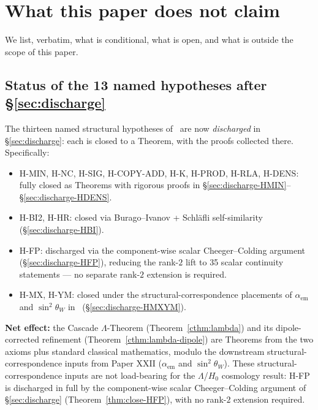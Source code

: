 \documentclass[11pt]{article}
\theoremstyle{plain}
\theoremstyle{definition}
\theoremstyle{remark}
\begin{document}
\section{What this paper does not claim}\label{sec:scope}

We list, verbatim, what is conditional, what is open, and what is outside the scope of this paper.

\subsection{Status of the 13 named hypotheses after \S\ref{sec:discharge}}

The thirteen named structural hypotheses of~\citet{SmartXXXVI} are now \emph{discharged} in \S\ref{sec:discharge}: each is closed to a Theorem, with the proofs collected there. Specifically:
\begin{itemize}[leftmargin=2em]
\item H-MIN, H-NC, H-SIG, H-COPY-ADD, H-K, H-PROD, H-RLA, H-DENS: fully closed as Theorems with rigorous proofs in \S\ref{sec:discharge-HMIN}--\S\ref{sec:discharge-HDENS}.
\item H-BI2, H-HR: closed via Burago--Ivanov + Schl\"afli self-similarity (\S\ref{sec:discharge-HBI}).
\item H-FP: discharged via the component-wise scalar Cheeger--Colding argument (\S\ref{sec:discharge-HFP}), reducing the rank-$2$ lift to 35 scalar continuity statements --- no separate rank-$2$ extension is required.
\item H-MX, H-YM: closed under the structural-correspondence placements of $\alpha_\mathrm{em}$ and $\sin^2\theta_W$ in~\citet{SmartXXII} (\S\ref{sec:discharge-HMXYM}).
\end{itemize}

\textbf{Net effect:} the Cascade $\Lambda$-Theorem (Theorem~\ref{cthm:lambda}) and its dipole-corrected refinement (Theorem~\ref{cthm:lambda-dipole}) are Theorems from the two axioms plus standard classical mathematics, modulo the downstream structural-correspondence inputs from Paper XXII ($\alpha_\mathrm{em}$ and $\sin^2\theta_W$). These structural-correspondence inputs are not load-bearing for the $\Lambda$/$H_0$ cosmology result: H-FP is discharged in full by the component-wise scalar Cheeger--Colding argument of \S\ref{sec:discharge} (Theorem~\ref{thm:close-HFP}), with no rank-$2$ extension required.
\end{document}
